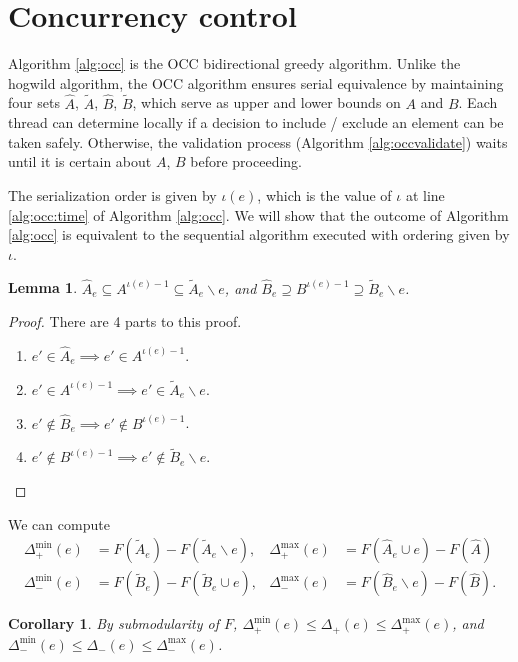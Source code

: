 \documentclass{article} %
\newtheorem{cor}[thm]{Corollary}
\newtheorem{lem}[thm]{Lemma}
\begin{document}
\section{Concurrency control}

Algorithm \ref{alg:occ} is the OCC bidirectional greedy algorithm.
Unlike the hogwild algorithm, the OCC algorithm ensures serial equivalence by maintaining four sets $\hat{A}$, $\tilde{A}$, $\hat{B}$, $\tilde{B}$, which serve as upper and lower bounds on $A$ and $B$.
Each thread can determine locally if a decision to include / exclude an element can be taken safely.
Otherwise, the validation process (Algorithm \ref{alg:occvalidate}) waits until it is certain about $A$, $B$ before proceeding.

The serialization order is given by $\iota(e)$, which is the value of $\iota$ at line \ref{alg:occ:time} of Algorithm \ref{alg:occ}.
We will show that the outcome of Algorithm \ref{alg:occ} is equivalent to the sequential algorithm executed with ordering given by $\iota$.

\begin{lem} $\hat{A}_e \subseteq A^{\iota(e)-1} \subseteq \tilde{A}_e \backslash e$, and $\hat{B}_e \supseteq B^{\iota(e)-1} \supseteq \tilde{B}_e \backslash e$.
\end{lem}
\begin{proof}
There are 4 parts to this proof.
\begin{enumerate}
\item $e' \in \hat{A}_e \implies e' \in A^{\iota(e)-1}$.
\item $e' \in A^{\iota(e)-1} \implies e' \in\tilde{A}_e \backslash e$.
\item $e' \not\in \hat{B}_e \implies e' \not\in B^{\iota(e)-1}$.
\item $e' \not\in B^{\iota(e)-1} \implies e' \not\in\tilde{B}_e \backslash e$.
\end{enumerate}
\end{proof}

We can compute
\begin{align*}
  \Delta_+^{\min}(e) &= F(\tilde{A}_e) - F(\tilde{A}_e \backslash e),
& \Delta_+^{\max}(e) &= F(\hat{A}_e \cup e) - F(\hat{A})\\
  \Delta_-^{\min}(e) &= F(\tilde{B}_e) - F(\tilde{B}_e \cup e),
& \Delta_-^{\max}(e) &= F(\hat{B}_e \backslash e) - F(\hat{B}).
\end{align*}

\begin{cor} By submodularity of $F$, $\Delta_+^{\min}(e) \leq \Delta_+(e) \leq \Delta_+^{\max}(e)$, and $\Delta_-^{\min}(e) \leq \Delta_-(e) \leq \Delta_-^{\max}(e)$.
\end{cor}
\end{document}
